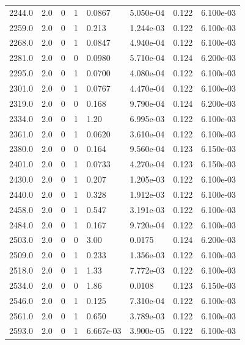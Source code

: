 \documentclass[preview]{standalone}
\begin{document}
{{{\begin{tabular}{L{1.2cm}C{1.2cm} C{0.3cm}C{0.5cm} C{1.4cm}C{1.4cm} C{1.4cm}C{1.4cm}}
  2244.0  &   2.0  & 0     &  1 &  0.0867  & 5.050e-04  & 0.122 &  6.100e-03   \\ 
  2259.0  &   2.0  & 0     &  1 &  0.213  & 1.244e-03  & 0.122 &  6.100e-03   \\ 
  2268.0  &   2.0  & 0     &  1 &  0.0847  & 4.940e-04  & 0.122 &  6.100e-03   \\ 
  2281.0  &   2.0  & 0     &  0 &  0.0980  & 5.710e-04  & 0.124 &  6.200e-03   \\ 
  2295.0  &   2.0  & 0     &  1 &  0.0700  & 4.080e-04  & 0.122 &  6.100e-03   \\ 
  2301.0  &   2.0  & 0     &  1 &  0.0767  & 4.470e-04  & 0.122 &  6.100e-03   \\ 
  2319.0  &   2.0  & 0     &  0 &  0.168  & 9.790e-04  & 0.124 &  6.200e-03   \\ 
  2334.0  &   2.0  & 0     &  1 &  1.20  & 6.995e-03  & 0.122 &  6.100e-03   \\ 
  2361.0  &   2.0  & 0     &  1 &  0.0620  & 3.610e-04  & 0.122 &  6.100e-03   \\ 
  2380.0  &   2.0  & 0     &  0 &  0.164  & 9.560e-04  & 0.123 &  6.150e-03   \\ 
  2401.0  &   2.0  & 0     &  1 &  0.0733  & 4.270e-04  & 0.123 &  6.150e-03   \\ 
  2430.0  &   2.0  & 0     &  1 &  0.207  & 1.205e-03  & 0.122 &  6.100e-03   \\ 
  2440.0  &   2.0  & 0     &  1 &  0.328  & 1.912e-03  & 0.122 &  6.100e-03   \\ 
  2458.0  &   2.0  & 0     &  1 &  0.547  & 3.191e-03  & 0.122 &  6.100e-03   \\ 
  2484.0  &   2.0  & 0     &  1 &  0.167  & 9.720e-04  & 0.122 &  6.100e-03   \\ 
  2503.0  &   2.0  & 0     &  0 &  3.00  & 0.0175  & 0.124 &  6.200e-03   \\ 
  2509.0  &   2.0  & 0     &  1 &  0.233  & 1.356e-03  & 0.122 &  6.100e-03   \\ 
  2518.0  &   2.0  & 0     &  1 &  1.33  & 7.772e-03  & 0.122 &  6.100e-03   \\ 
  2534.0  &   2.0  & 0     &  0 &  1.86  & 0.0108  & 0.123 &  6.150e-03   \\ 
  2546.0  &   2.0  & 0     &  1 &  0.125  & 7.310e-04  & 0.122 &  6.100e-03   \\ 
  2561.0  &   2.0  & 0     &  1 &  0.650  & 3.789e-03  & 0.122 &  6.100e-03   \\ 
  2593.0  &   2.0  & 0     &  1 &  6.667e-03  & 3.900e-05  & 0.122 &  6.100e-03   \\ 

\end{tabular}}}}
\end{document}
